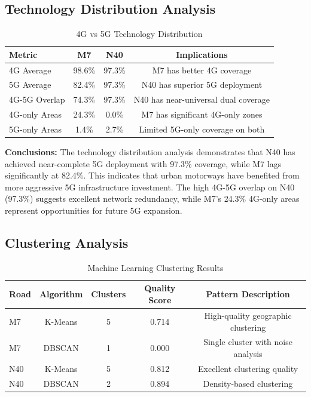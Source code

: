 \documentclass[MScCS]{uccthesis}
\begin{document}
\subsection{Technology Distribution Analysis}

\begin{table}[h]
\centering
\caption{4G vs 5G Technology Distribution}
\label{tab:technology_distribution}
\begin{tabular}{|l|c|c|c|}
\hline
\textbf{Metric} & \textbf{M7 } & \textbf{N40} & \textbf{Implications} \\
\hline
4G Average & 98.6\% & 97.3\% & M7 has better 4G coverage \\
\hline
5G Average & 82.4\% & 97.3\% & N40 has superior 5G deployment \\
\hline
4G-5G Overlap & 74.3\% & 97.3\% & N40 has near-universal dual coverage \\
\hline
4G-only Areas & 24.3\% & 0.0\% & M7 has significant 4G-only zones \\
\hline
5G-only Areas & 1.4\% & 2.7\% & Limited 5G-only coverage on both \\
\hline
\end{tabular}
\end{table}

\textbf{Conclusions:} The technology distribution analysis demonstrates that N40 has achieved near-complete 5G deployment with 97.3\% coverage, while M7 lags significantly at 82.4\%. This indicates that urban motorways have benefited from more aggressive 5G infrastructure investment. The high 4G-5G overlap on N40 (97.3\%) suggests excellent network redundancy, while M7's 24.3\% 4G-only areas represent opportunities for future 5G expansion.

\subsection{Clustering Analysis}

\begin{table}[h]
\centering
\caption{Machine Learning Clustering Results}
\label{tab:clustering_results}
\begin{tabular}{|l|c|c|c|c|}
\hline
\textbf{Road} & \textbf{Algorithm} & \textbf{Clusters} & \textbf{Quality Score} & \textbf{Pattern Description} \\
\hline
M7  & K-Means & 5 & 0.714 & High-quality geographic clustering \\
\hline
M7  & DBSCAN & 1 & 0.000 & Single cluster with noise analysis \\
\hline
N40 & K-Means & 5 & 0.812 & Excellent clustering quality \\
\hline
N40 & DBSCAN & 2 & 0.894 & Density-based clustering \\
\hline
\end{tabular}
\end{table}
\end{document}

